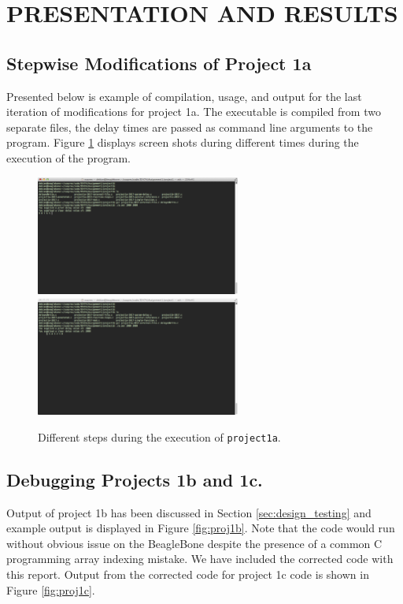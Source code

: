 \documentclass[letterpaper, 12pt]{article}
\begin{document}
\section{PRESENTATION AND RESULTS}
\label{sec:results}
\subsection{Stepwise Modifications of Project 1a}
Presented below is example of compilation, usage, and output for the last iteration of modifications for project 1a.   The  executable is compiled from two separate files, the delay times are passed as command line arguments to the program.  Figure \ref{fig:proj1a} displays screen shots during different times during the execution of the program.

\begin{figure}[!ht]
  \centering
  \captionsetup{width=0.8\textwidth}
  \includegraphics[width=0.6\textwidth]{images/ss1.png}
  \includegraphics[width=0.6\textwidth]{images/ss2.png}
  \cprotect\caption{Different steps during the execution of \verb+project1a+.}
 \label{fig:proj1a}
\end{figure}

\subsection{Debugging Projects 1b and 1c.}
Output of project 1b has been discussed in Section \ref{sec:design_testing} and example output is displayed in Figure \ref{fig:proj1b}.  Note that the code would  run without obvious issue on the BeagleBone despite the presence of a common C programming array indexing mistake.  We have included the corrected code with this report.  Output from the corrected  code for project 1c code is shown in  Figure \ref{fig:proj1c}.
\end{document}
